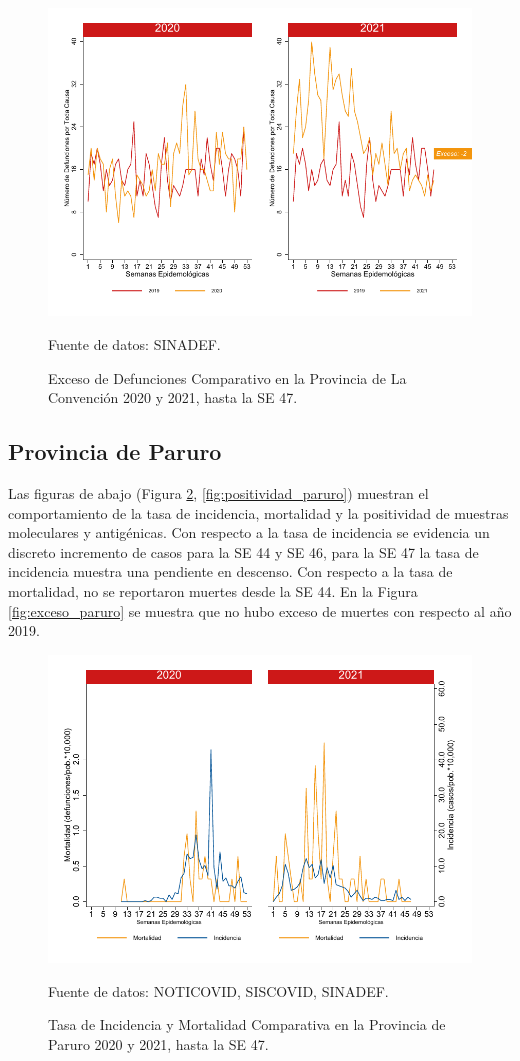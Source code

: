 \documentclass[12pt,a4paper,openany]{book}
\begin{document}
		\begin{figure}[h]
			\caption{Exceso de Defunciones Comparativo en la Provincia de La Convención 2020 y 2021, hasta la SE 47.}\label{fig:exceso_laconv}
			\begin{center}
				\includegraphics[width=0.7\linewidth]{../figuras/exceso_9}
			\end{center}
			{\footnotesize {Fuente de datos: SINADEF.}}
		\end{figure}
		
		\clearpage
		
		\subsection*{Provincia de Paruro}
		\noindent Las figuras de abajo (Figura \ref{fig:inc_mort_paruro}, \ref{fig:positividad_paruro}) muestran el comportamiento de la tasa de incidencia, mortalidad y la positividad de muestras moleculares y antigénicas. Con respecto a la tasa de incidencia se evidencia un discreto incremento de casos para la SE 44 y SE 46, para la SE 47 la tasa de incidencia muestra una pendiente en descenso.  
		Con respecto a la tasa de mortalidad, no se reportaron muertes desde la SE 44.
	 En la Figura \ref{fig:exceso_paruro} se muestra que no hubo exceso de muertes con respecto al año 2019.
		
		\begin{figure}[h]
			\caption{Tasa de Incidencia y Mortalidad Comparativa en la Provincia de Paruro 2020 y 2021, hasta la SE 47.}\label{fig:inc_mort_paruro}
			\begin{center}
				\includegraphics[width=0.7\linewidth]{../figuras/incidencia_mortalidad_20_21_10}
			\end{center}
			{\footnotesize {Fuente de datos: NOTICOVID, SISCOVID, SINADEF.}} 
		\end{figure}
		
\end{document}
